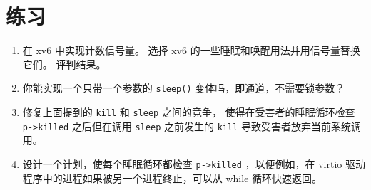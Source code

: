\section{练习}

\begin{enumerate}

\item 在 xv6 中实现计数信号量。
选择 xv6 的一些睡眠和唤醒用法并用信号量替换它们。
评判结果。

\item 你能实现一个只带一个参数的 {\tt sleep()} 变体吗，即通道，不需要锁参数？

\item 修复上面提到的
\lstinline{kill}
和
\lstinline{sleep}
之间的竞争，
使得在受害者的睡眠循环检查
\lstinline{p->killed}
之后但在调用
\lstinline{sleep}
之前发生的
\lstinline{kill}
导致受害者放弃当前系统调用。

\item 设计一个计划，使每个睡眠循环都检查
\lstinline{p->killed}
，以便例如，在 virtio 驱动程序中的进程如果被另一个进程终止，可以从 while 循环快速返回。

\end{enumerate}
